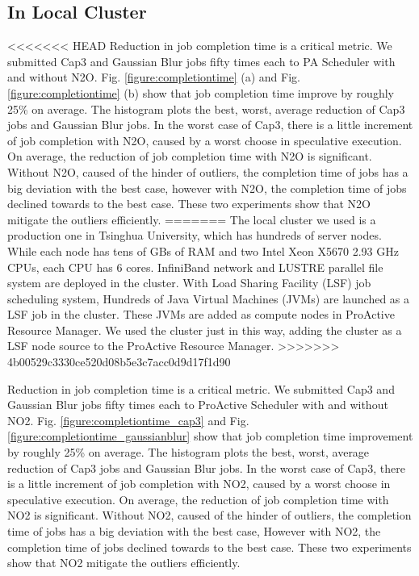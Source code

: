 \subsection{In Local Cluster}

<<<<<<< HEAD
Reduction in job completion time is a critical metric. We submitted Cap3 and Gaussian Blur jobs fifty times each to PA Scheduler with and without N2O. Fig.  \ref{figure:completiontime} (a) and Fig.  \ref{figure:completiontime} (b) show that job completion time improve by roughly 25\% on average. The histogram plots the best, worst, average reduction of Cap3 jobs and Gaussian Blur jobs. In the worst case of Cap3, there is a little increment of job completion with N2O, caused by a worst choose in speculative execution. On average, the reduction of job completion time with N2O is significant. Without N2O, caused of the hinder of outliers, the completion time of jobs has a big deviation with the best case, however with N2O, the completion time of jobs declined towards to the best case. These two experiments show that N2O mitigate the outliers efficiently.
=======
The local cluster we used is a production one in Tsinghua University, which has hundreds of  server nodes. While each node has tens of GBs of RAM and two Intel Xeon X5670 2.93 GHz CPUs, each CPU has 6 cores. InfiniBand network and LUSTRE parallel file system are deployed in the cluster. With Load Sharing Facility (LSF) job scheduling system, Hundreds of Java Virtual Machines (JVMs) are launched as a LSF job in the cluster. These JVMs are added as compute nodes in ProActive Resource Manager. We used the cluster just in this way, adding the cluster as a LSF node source to the ProActive Resource Manager.
>>>>>>> 4b00529c3330ce520d08b5e3c7acc0d9d17f1d90

Reduction in job completion time is a critical metric. We submitted Cap3 and Gaussian Blur jobs fifty times each to ProActive Scheduler with and without NO2. Fig. \ref{figure:completiontime_cap3} and Fig. \ref{figure:completiontime_gaussianblur} show that job completion time improvement by roughly 25\% on average. The histogram plots the best, worst, average reduction of Cap3 jobs and Gaussian Blur jobs. In the worst case of Cap3, there is a little increment of job completion with NO2, caused by a worst choose in speculative execution. On average, the reduction of job completion time with NO2 is significant. Without NO2, caused of the hinder of outliers, the completion time of jobs has a big deviation with the best case, However with NO2, the completion time of jobs declined towards to the best case. These two experiments show that NO2 mitigate the outliers efficiently.

